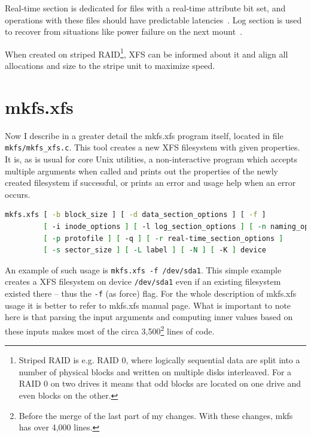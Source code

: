 Real-time section is dedicated for files with a real-time attribute bit set, and operations with these files should have predictable latencies~\cite{xfsRealtime}. Log section is used to recover from situations like power failure on the next mount~\cite{xfsStructure,xfsman}.

When created on striped RAID\footnote{Striped RAID is e.g. RAID 0, where logically sequential data are split into a number of physical blocks and written on multiple disks interleaved. For a RAID 0 on two drives it means that odd blocks are located on one drive and even blocks on the other.}, XFS can be informed about it and align all allocations and size to the stripe unit to maximize speed.


\section{mkfs.xfs}\label{chap:xfs:mkfs}

Now I describe in a greater detail the mkfs.xfs program itself, located in file {\tt mkfs/mkfs\_xfs.c}. This tool creates a new XFS filesystem with given properties. It is, as is usual for core Unix utilities, a non-interactive program which accepts multiple arguments when called and prints out the properties of the newly created filesystem if successful, or prints an error and usage help when an error occurs.

\begin{lstlisting}[frame=none, basicstyle=\footnotesize\ttfamily, language=Bash, numbers=none, numberstyle=\tiny\color{black},caption= {Synopsis of mkfs.xfs utility~\cite{mkfs.xfsMan}.}]
mkfs.xfs [ -b block_size ] [ -d data_section_options ] [ -f ]
         [ -i inode_options ] [ -l log_section_options ] [ -n naming_options ]
         [ -p protofile ] [ -q ] [ -r real-time_section_options ]
         [ -s sector_size ] [ -L label ] [ -N ] [ -K ] device
\end{lstlisting}

An example of such usage is {\tt mkfs.xfs -f /dev/sda1}. This simple example creates a XFS filesystem on device {\tt /dev/sda1} even if an existing filesystem existed there -- thus the {\tt -f} (as force) flag. For the whole description of mkfs.xfs usage it is better to refer to mkfs.xfs manual page. What is important to note here is that parsing the input arguments and computing inner values based on these inputs makes most of the circa 3,500\footnote{Before the merge of the last part of my changes. With these changes, mkfs has over 4,000 lines.} lines of code.

